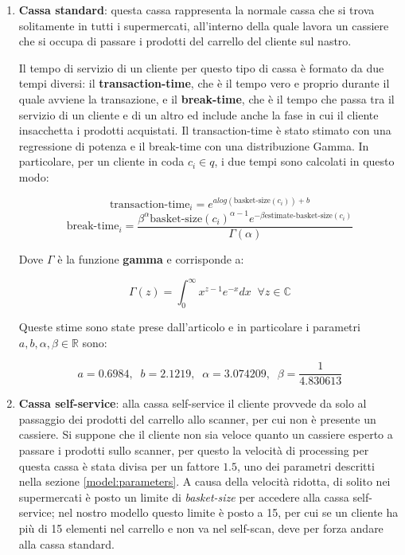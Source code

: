 \begin{enumerate}
\item \textbf{Cassa standard}: questa cassa rappresenta la normale cassa che si trova solitamente in tutti i supermercati, all'interno della quale lavora un cassiere che si occupa di passare i prodotti del carrello del cliente sul nastro.
 
Il tempo di servizio di un cliente per questo tipo di cassa è formato da due tempi diversi: il \textbf{transaction-time}, che è il tempo vero e proprio durante il quale avviene la transazione, e il \textbf{break-time}, che è il tempo che passa tra il servizio di un cliente e di un altro ed include anche la fase in cui il cliente insacchetta i prodotti acquistati. Il transaction-time è stato stimato con una regressione di potenza e il break-time con una distribuzione Gamma. In particolare, per un cliente in coda $c_i \in q$, i due tempi sono calcolati in questo modo:

\begin{equation}\label{eq:transaction-time-standard}
\text{transaction-time}_i = e^{a log(\text{basket-size}(c_i)) + b}
\end{equation}
\begin{equation}\label{eq:break-time-standard}
\text{break-time}_i = \frac{\beta^{\alpha} \text{basket-size}(c_i)^{\alpha - 1} e^{- \beta \text{estimate-basket-size}(c_i)}}{\Gamma (\alpha)}
\end{equation}

Dove $\Gamma$ è la funzione \textbf{gamma} e corrisponde a:

\begin{equation}
\Gamma (z) = \int_{0}^{\infty} x^{z-1} e^{-x} dx \;\; \forall z \in \mathbb{C}
\end{equation}

Queste stime sono state prese dall'articolo \cite{article1} e in particolare i parametri $a,b,\alpha ,\beta \in \mathbb{R}$ sono:

\begin{equation}
a = 0.6984, \;\; b = 2.1219, \;\; \alpha = 3.074209, \;\; \beta = \frac{1}{4.830613}
\end{equation}

\item \textbf{Cassa self-service}: alla cassa self-service il cliente provvede da solo al passaggio dei prodotti del carrello allo scanner, per cui non è presente un cassiere. Si suppone che il cliente non sia veloce quanto un cassiere esperto a passare i prodotti sullo scanner, per questo la velocità di processing per questa cassa è stata divisa per un fattore $1.5$, uno dei parametri descritti nella sezione \ref{model:parameters}. A causa della velocità ridotta, di solito nei supermercati è posto un limite di \textit{basket-size} per accedere alla cassa self-service; nel nostro modello questo limite è posto a 15, per cui se un cliente ha più di 15 elementi nel carrello e non va nel self-scan, deve per forza andare alla cassa standard.


\end{enumerate}
